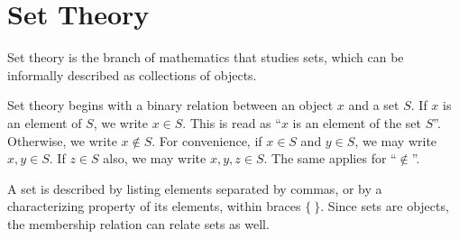 

\newcommand{\version}{0.6}
\newcommand{\volumenumber}{0}
\newcommand{\volumename}{Prerequisites}

\newcommand{\quotepagetext}{
    Aus dem Paradies, das Cantor uns geschaffen, soll uns niemand vertreiben k\"{o}nnen.\\
    \textit{(No one shall expel us from the Paradise that Cantor has created.)}
}
\newcommand{\quotepageattribution}{David Hilbert, 1926}
\newcommand{\quotepagecitation}{\cite[p.~170]{hilbert_1926}}

\newcommand{\prefacevolumetext}{
    This volume, in particular, serves to provide the necessary prerequisites needed to engage with the subject material. In particular, this volume covers basic set theory, functions/mappings, mathematical logic and proof writing, elementary number theory, and simple modular arithmetic. This background should be sufficient to understand the subject material described in the other volumes.
}

\linespread{1.05}

\renewcommand{\thetheorem}{\arabic{part}.\arabic{chapter}.\arabic{section}.\arabic{theorem}}
\renewcommand{\theexercisehidden}{\arabic{part}.\arabic{chapter}.\arabic{exercisehidden}}
\renewcommand{\theproblem}{\arabic{part}.\arabic{chapter}.\arabic{problem}}


\frontmatterpages

\chapter{Set Theory}
Set theory is the branch of mathematics that studies sets, which can be informally described as collections of objects.

Set theory begins with a binary relation between an object $x$ and a set $S$. If $x$ is an element of $S$, we write $x \in S$. This is read as ``$x$ is an element of the set $S$''. Otherwise, we write $x \notin S$. For convenience, if $x \in S$ and $y \in S$, we may write $x, y \in S$. If $z \in S$ also, we may write $x, y, z \in S$. The same applies for ``$\notin$''.

A set is described by listing elements separated by commas, or by a characterizing property of its elements, within braces $\{ \ \}$. Since sets are objects, the membership relation can relate sets as well.

